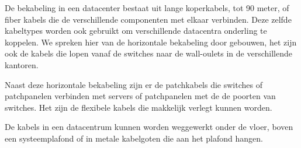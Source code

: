 De bekabeling in een datacenter bestaat uit lange koperkabels, tot 90 meter, of fiber kabels die de verschillende componenten met elkaar verbinden. Deze zelfde kabeltypes worden ook gebruikt om verschillende datacentra onderling te koppelen. We spreken hier van de horizontale bekabeling door gebouwen, het zijn ook de kabels die lopen vanaf de switches naar de wall-oulets in de verschillende kantoren.

Naast deze horizontale bekabeling zijn er de patchkabels die switches of patchpanelen verbinden met servers of patchpanelen met de de poorten van switches. Het zijn de flexibele kabels die makkelijk verlegt kunnen worden.

De kabels in een datacentrum kunnen worden weggewerkt onder de vloer, boven een systeemplafond of in metale kabelgoten die aan het plafond hangen.
